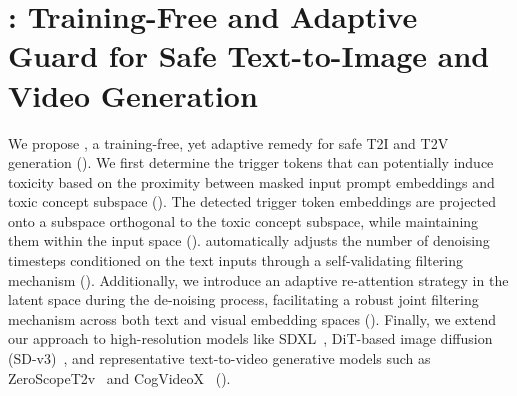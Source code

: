 \section{\ours: Training-Free and Adaptive Guard for Safe Text-to-Image and Video Generation}


We propose \ours{}, a training-free, yet adaptive remedy for safe T2I and T2V generation (). 
We first determine the trigger tokens that can potentially induce toxicity based on the proximity between masked input prompt embeddings and toxic concept subspace (). 
{%
The detected trigger token embeddings are projected onto a subspace orthogonal to the toxic concept subspace, while maintaining them within the input space
().
\ours{} automatically adjusts the number of denoising timesteps conditioned on the text inputs through a self-validating filtering mechanism (). }Additionally, 
we introduce an adaptive re-attention strategy in the latent space during the de-noising process, facilitating a robust joint filtering mechanism across both text and visual embedding spaces ().
Finally, we extend our approach to high-resolution models like SDXL~\citep{podell2023sdxl}, DiT-based image diffusion (SD-v3)~\citep{peebles2023scalable}, and representative text-to-video generative models such as ZeroScopeT2v~\citep{2023zeroscope} and CogVideoX~\citep{yang2024cogvideox} ().

